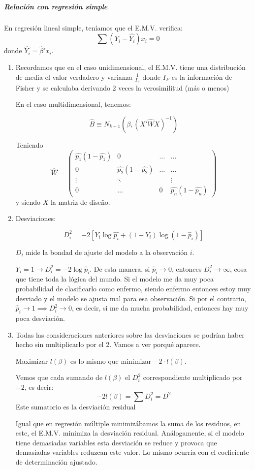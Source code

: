 \subparagraph{Relación con regresión simple}

En regresión lineal simple, teníamos que el E.M.V. verifica: \[ \sum (Y_i - \hat{Y_i}) x_i = 0\] donde $\hat{Y_i} = \hat{β}'x_i$. 


\obs

\begin{enumerate}
  \item Recordamos que en el caso unidimensional, el E.M.V. tiene una distribución de media el valor verdadero y varianza $\frac{1}{I_F}$ donde $I_F$ es la información de Fisher y se calculaba derivando 2 veces la verosimilitud (más o menos)

  En el caso multidimensional, tenemos:

  \[
  \hat{B} \equiv N_{k+1}\left( β,(X'\hat{W}X)^{-1}\right)
  \]

  Teniendo \[\hat{W} = \begin{pmatrix}\hat{p_1}(1-\hat{p_1}) & 0 & \dots & \dots \\ 0 & \hat{p_2}(1-\hat{p_2}) & \dots & \dots \\ \vdots &\ddots & & \vdots \\ 0 & \dots & 0 & \hat{p_n}(1-\hat{p_n})
   \end{pmatrix}\]
  y siendo $X$ la matriz de diseño.
  \item Desviaciones:

    \[D_i^2 = -2\left[ Y_i\log \hat{p_i} + (1-Y_i)\log(1-\hat{p}_i)\right] \]

  $D_i$ mide la bondad de ajuste del modelo a la observación $i$. 

  \subitem $Y_i = 1 \to D_i^2 = -2\log \hat{p}_i$. De esta manera, si $\hat{p}_i \to 0$, entonces $D_i^2 \to ∞$, cosa que tiene toda la lógica del mundo. Si el modelo me da muy poca probabilidad de clasificarlo como enfermo, siendo enfermo entonces estoy muy desviado y el modelo se ajusta mal para esa observación. Si por el contrario, $\hat{p}_i \to 1 \implies D_i^2 \to 0$, es decir, si me da mucha probabilidad, entonces hay muy poca desviación.

  \item Todas las consideraciones anteriores sobre las desviaciones se podrían haber hecho sin multiplicarlo por el 2. Vamos a ver porqué aparece.

  Maximizar $l(β)$ es lo mismo que minimizar $-2·l(β)$. 

  \begin{defn}
    Vemos que cada sumando de $l(β)$ el $D_i^2$ correspondiente multiplicado por $-2$, es decir:
    \[
      -2 l(β) = \sum D_i^2 = D^2
    \]
    Este sumatorio es la desviación residual
  \end{defn}
  \obs Igual que en regresión múltiple minimizábamos la suma de los residuos, en este, el E.M.V. minimiza la desviación residual. Análogamente, si el modelo tiene demasiadas variables esta desviación se reduce y provoca que demasiadas variables reduzcan este valor. Lo mismo ocurría con el coeficiente de determinación ajustado.


\end{enumerate}
